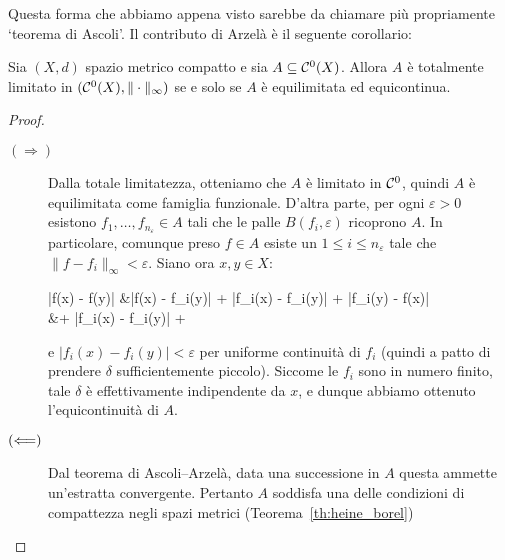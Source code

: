 Questa forma che abbiamo appena visto sarebbe da chiamare più propriamente `teorema di Ascoli'. Il contributo di Arzelà è il seguente corollario:

\begin{corollary}
	Sia $(X,d)$ spazio metrico compatto e sia $A \subseteq \mathcal{C}^0(X)$.
	Allora $A$ è totalmente limitato in $(\mathcal{C}^0(X), \|\cdot\|_\infty)$ se e solo se $A$ è equilimitata ed equicontinua.
\end{corollary}
\begin{proof}
	\leavevmode
	\begin{description}
		\item[$(\Longrightarrow)$] Dalla totale limitatezza, otteniamo che $A$ è limitato in $\mathcal{C}^0$, quindi $A$ è equilimitata come famiglia funzionale.
		D'altra parte, per ogni $\varepsilon > 0$ esistono $f_1, \ldots, f_{n_\varepsilon} \in A$ tali che le palle $B(f_i, \varepsilon)$ ricoprono $A$. In particolare, comunque preso $f \in A$ esiste un $1 \leq i \leq n_\varepsilon$ tale che $\|f-f_i\|_\infty < \varepsilon$. Siano ora $x,y \in X$:
		\begin{eqalign*}
			|f(x) - f(y)| &\leq |f(x) - f_i(y)| + |f_i(x) - f_i(y)| + |f_i(y) - f(x)|\\
			&\leq \varepsilon + |f_i(x) - f_i(y)| + \varepsilon
		\end{eqalign*}
		e $|f_i(x) - f_i(y)| < \varepsilon$ per uniforme continuità di $f_i$ (quindi a patto di prendere $\delta$ sufficientemente piccolo). Siccome le $f_i$ sono in numero finito, tale $\delta$ è effettivamente indipendente da $x$, e dunque abbiamo ottenuto l'equicontinuità di $A$.
		\item[$(\Longleftarrow)$] Dal teorema di Ascoli--Arzelà, data una successione in $A$ questa ammette un'estratta convergente. Pertanto $A$ soddisfa una delle condizioni di compattezza negli spazi metrici (Teorema~\ref{th:heine_borel})
	\end{description}
\end{proof}

